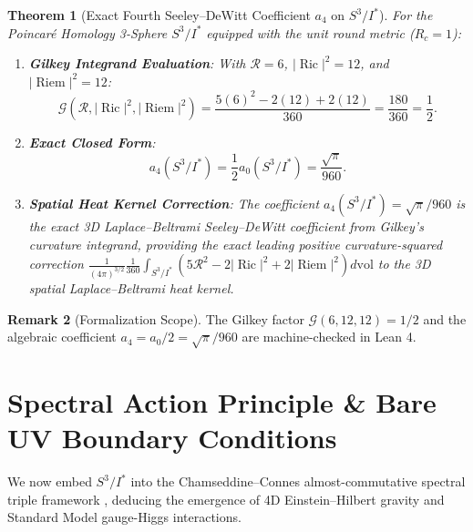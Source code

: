 \documentclass[11pt,a4paper]{article}
\newtheorem{theorem}{Theorem}[section]
\theoremstyle{definition}
\newtheorem{remark}[theorem]{Remark}
\DeclareMathOperator{\Ric}{Ric}
\DeclareMathOperator{\Riem}{Riem}
\begin{document}
\begin{theorem}[Exact Fourth Seeley--DeWitt Coefficient $a_4$ on $S^3 / I^*$]
For the Poincar\'e Homology 3-Sphere $S^3 / I^*$ equipped with the unit round metric ($R_c = 1$):
\begin{enumerate}
\item \textbf{Gilkey Integrand Evaluation}: With $\mathcal{R} = 6$, $|\Ric|^2 = 12$, and $|\Riem|^2 = 12$:
\begin{equation}
\mathcal{G}\left(\mathcal{R}, |\Ric|^2, |\Riem|^2\right) = \frac{5(6)^2 - 2(12) + 2(12)}{360} = \frac{180}{360} = \frac{1}{2}.
\end{equation}
\item \textbf{Exact Closed Form}:
\begin{equation}
a_4(S^3 / I^*) = \frac{1}{2} a_0(S^3 / I^*) = \frac{\sqrt{\pi}}{960}.
\end{equation}
\item \textbf{Spatial Heat Kernel Correction}: The coefficient $a_4(S^3/I^*) = \sqrt{\pi}/960$ is the exact 3D Laplace--Beltrami Seeley--DeWitt coefficient from Gilkey's curvature integrand, providing the exact leading positive curvature-squared correction $\frac{1}{(4\pi)^{3/2}} \frac{1}{360} \int_{S^3/I^*} (5\mathcal{R}^2 - 2|\Ric|^2 + 2|\Riem|^2) d\mathrm{vol}$ to the 3D spatial Laplace--Beltrami heat kernel.
\end{enumerate}
\end{theorem}

\begin{remark}[Formalization Scope]
The Gilkey factor $\mathcal{G}(6, 12, 12) = 1/2$ and the algebraic coefficient $a_4 = a_0/2 = \sqrt{\pi}/960$ are machine-checked in Lean 4.
\end{remark}

\section{Spectral Action Principle \& Bare UV Boundary Conditions}

We now embed $S^3 / I^*$ into the Chamseddine--Connes almost-commutative spectral triple framework \cite{Connes1994,Chamseddine1996,Chamseddine1997,Chamseddine2007,vanSuijlekom2015,Marcolli2018}, deducing the emergence of 4D Einstein--Hilbert gravity and Standard Model gauge-Higgs interactions.
\end{document}
